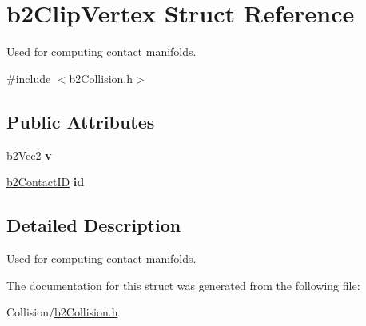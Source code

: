 \hypertarget{structb2ClipVertex}{}\section{b2\+Clip\+Vertex Struct Reference}
\label{structb2ClipVertex}


Used for computing contact manifolds.  




{\ttfamily \#include $<$b2\+Collision.\+h$>$}

\subsection*{Public Attributes}
\begin{DoxyCompactItemize}
\item 
\mbox{\label{structb2ClipVertex_a6c8d8e4c0667755d5295a9c0d91d5b87}} 
\mbox{\hyperlink{structb2Vec2}{b2\+Vec2}} {\bfseries v}
\item 
\mbox{\label{structb2ClipVertex_ac0f6d48eafc40a665bc18d4aa821689d}} 
\mbox{\hyperlink{unionb2ContactID}{b2\+Contact\+ID}} {\bfseries id}
\end{DoxyCompactItemize}


\subsection{Detailed Description}
Used for computing contact manifolds. 

The documentation for this struct was generated from the following file\+:\begin{DoxyCompactItemize}
\item 
Collision/\mbox{\hyperlink{b2Collision_8h}{b2\+Collision.\+h}}\end{DoxyCompactItemize}
